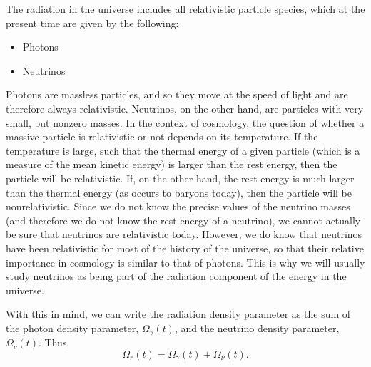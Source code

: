 \documentclass[11pt, a4paper,oneside,openright]{book}
\numberwithin{equation}{section}
\begin{document}
The radiation in the universe includes all relativistic particle species, which at the present time are given by the following:
\begin{itemize}
\item Photons
\item Neutrinos
\end{itemize}
Photons are massless particles, and so they move at the speed of light and are therefore always relativistic. Neutrinos, on the other hand, are particles with very small, but nonzero masses. In the context of cosmology, the question of whether a massive particle is relativistic or not depends on its temperature. If the temperature is large, such that the thermal energy of a given particle (which is a measure of the mean kinetic energy) is larger than the rest energy, then the particle will be relativistic. If, on the other hand, the rest energy is much larger than the thermal energy (as occurs to baryons today), then the particle will be nonrelativistic. Since we do not know the precise values of the neutrino masses (and therefore we do not know the rest energy of a neutrino), we cannot actually be sure that neutrinos are relativistic today. However, we do know that neutrinos have been relativistic for most of the history of the universe, so that their relative importance in cosmology is similar to that of 
photons. This is why we will usually study neutrinos as being part of the radiation component of the energy in the universe.

With this in mind, we can write the radiation density parameter as the sum of the photon density parameter, $\Omega_{\gamma}(t)$, and the neutrino density parameter, $\Omega_{\nu}(t)$. Thus,
\begin{equation}
\Omega_r(t)=\Omega_{\gamma}(t)+\Omega_{\nu}(t).
\end{equation}
\end{document}
